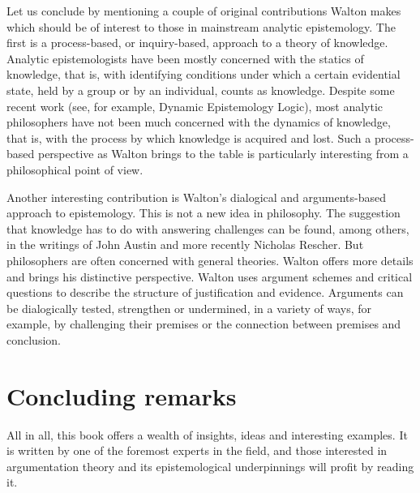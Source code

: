 \documentclass[12pt]{article}
\begin{document}
Let us conclude by mentioning 
a couple of original contributions Walton makes 
which should be of interest to those 
in mainstream analytic epistemology. The first is a process-based, or
inquiry-based, approach to a theory of knowledge. Analytic
epistemologists have been mostly concerned with the statics of knowledge, 
that is, with identifying conditions under which a certain
evidential state, held by a group or by an individual, counts as
knowledge. Despite some recent work (see, for example, 
Dynamic Epistemology Logic), most analytic philosophers have not
been much concerned with the dynamics of knowledge, that is, with
the process by which knowledge is acquired and lost. Such a process-based
perspective as Walton brings to the table is particularly interesting
from a philosophical point of view. 

Another interesting contribution is Walton's dialogical and arguments-based 
approach to epistemology. This is not a new idea in philosophy. The suggestion 
that knowledge has to do with answering challenges can be found, among others,
in the writings of John Austin and more recently Nicholas Rescher. 
But philosophers are often concerned with general 
theories. Walton offers more details and 
brings his distinctive perspective.
Walton uses argument schemes and critical questions
to describe the structure of justification and evidence. 
Arguments can be dialogically tested, strengthen or undermined, 
in a variety of ways, for example, by challenging their premises 
or the connection between premises and conclusion.  


\section{Concluding remarks}

\noindent All in all, this book offers a wealth of
insights, ideas and interesting examples. It is written by one of the
foremost experts in the field, and those interested in argumentation
theory and its epistemological underpinnings will profit 
by reading it.
\end{document}
